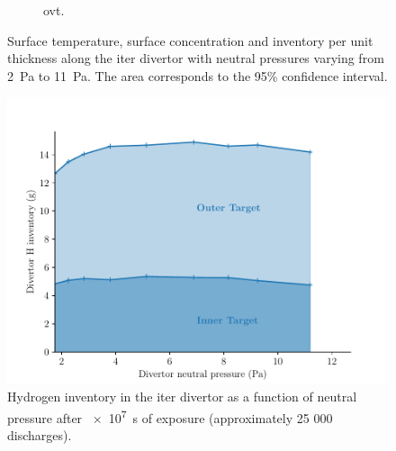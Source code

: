 \begin{figure}[h!]
\begin{subfigure}{0.58\linewidth}
        \caption{\gls{ovt}.}
    \end{subfigure}
    \caption{Surface temperature, surface concentration and \gls{inventory} per unit thickness along the \gls{iter} \gls{divertor} with neutral pressures varying from \SI{2}{Pa} to \SI{11}{Pa}. The area corresponds to the 95\% confidence interval.}
\end{figure}


\begin{figure}[h]
    \centering
    \includegraphics[width=\linewidth]{Figures/Chapter4/ITER/inventory_vs_divertor_pressure.pdf}
    \caption{Hydrogen \gls{inventory} in the \gls{iter} \gls{divertor} as a function of neutral pressure after \SI{e7}{s} of exposure (approximately 25 000 discharges).}
\end{figure}


